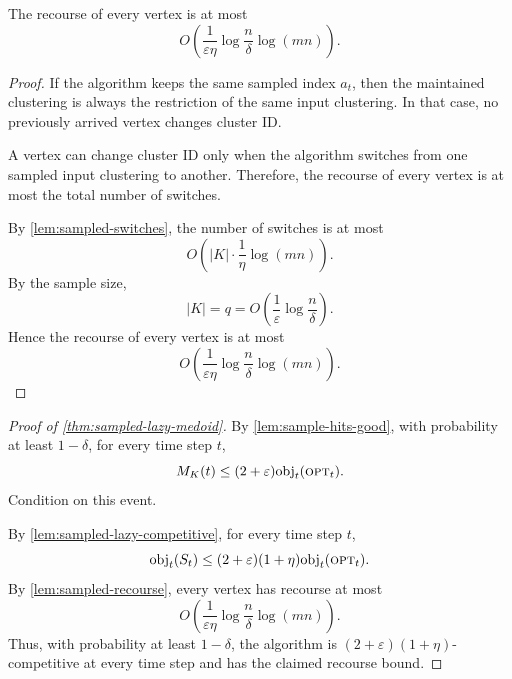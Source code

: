 \begin{lemma}
\label{lem:sampled-recourse}
The recourse of every vertex is at most
\[
    O\left(
        \frac{1}{\varepsilon\eta}
        \log\frac{n}{\delta}
        \log(mn)
    \right).
\]
\end{lemma}

\begin{proof}
If the algorithm keeps the same sampled index \(a_t\), then the maintained clustering is always the restriction of the same input clustering. In that case, no previously arrived vertex changes cluster ID.

A vertex can change cluster ID only when the algorithm switches from one sampled input clustering to another. Therefore, the recourse of every vertex is at most the total number of switches.

By \cref{lem:sampled-switches}, the number of switches is at most
\[
    O\left(
        |K|\cdot \frac{1}{\eta}\log(mn)
    \right).
\]
By the sample size,
\[
    |K|
    =
    q
    =
    O\left(
        \frac{1}{\varepsilon}\log\frac{n}{\delta}
    \right).
\]
Hence the recourse of every vertex is at most
\[
    O\left(
        \frac{1}{\varepsilon\eta}
        \log\frac{n}{\delta}
        \log(mn)
    \right).
\]
\end{proof}

\begin{proof}[Proof of \cref{thm:sampled-lazy-medoid}]
By \cref{lem:sample-hits-good}, with probability at least \(1-\delta\), for every time step \(t\),
\[
    M_K(t)\le (2+\varepsilon)\text{obj}_t(\textsc{opt}_t).
\]
Condition on this event.

By \cref{lem:sampled-lazy-competitive}, for every time step \(t\),
\[
    \text{obj}_t(S_t)
    \le
    (2+\varepsilon)(1+\eta)\text{obj}_t(\textsc{opt}_t).
\]
By \cref{lem:sampled-recourse}, every vertex has recourse at most
\[
    O\left(
        \frac{1}{\varepsilon\eta}
        \log\frac{n}{\delta}
        \log(mn)
    \right).
\]
Thus, with probability at least \(1-\delta\), the algorithm is \((2+\varepsilon)(1+\eta)\)-competitive at every time step and has the claimed recourse bound.
\end{proof}